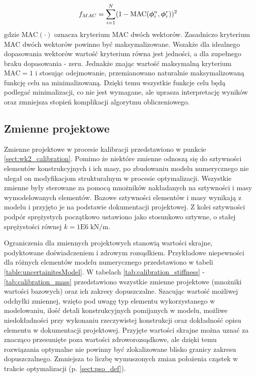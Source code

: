 \begin{equation} \label{eq:wk2_calib_f_mass}
	f_{MAC}=\sum_{i=1}^{N} (1-\text{MAC}(\bm{\phi}_i^n, \bm{\phi}_i^r))^2
\end{equation}
gdzie $\text{MAC}(\cdot)$ oznacza kryterium MAC dwóch wektorów. Zasadniczo kryterium MAC dwóch wektorów powinno być maksymalizowane. Wszakże dla idealnego dopasowania wektorów wartość kryterium równa jest jedności, a dla zupełnego braku dopasowania - zeru. Jednakże znając wartość maksymalną kryterium $\text{MAC}=1$ i stosując odejmowanie, przemianowano naturalnie maksymalizowaną funkcję celu na minimalizowaną. Dzięki temu wszystkie funkcje celu będą podlegać minimalizacji, co nie jest wymagane, ale uprasza interpretację wyników oraz zmniejsza stopień komplikacji algorytmu obliczeniowego.

\subsection{Zmienne projektowe}
Zmienne projektowe w procesie kalibracji przedstawiono w punkcie \ref{sect:wk2_calibration}. Pomimo że niektóre zmienne odnoszą się do sztywności elementów konstrukcyjnych i ich masy, po zbudowaniu modelu numerycznego nie ulegał on modyfikacjom strukturalnym w procesie optymalizacji. Wszystkie zmienne były sterowane za pomocą mnożników nakładanych na sztywności i masy wymodelowanych elementów. Bazowe sztywności elementów i masy wynikają z modelu i przyjęto je na podstawie dokumentacji projektowej. Z kolei sztywności podpór sprężystych początkowo ustawiono jako stosunkowo sztywne, o stałej sprężystości równej $k=1\text{E}6\;\text{kN/m}$. 

Ograniczenia dla zmiennych projektowych stanowią wartości skrajne, podyktowane doświadczeniem i zdrowym rozsądkiem. Przykładowe niepewności dla różnych elementów modelu numerycznego przedstawiono w tabeli \ref{table:uncertainitesModel}. W tabelach \ref{tab:calibration_stiffness} - \ref{tab:calibration_mass} przedstawiono wszystkie zmienne projektowe (mnożniki wartości bazowych) oraz ich zakresy dopuszczalne. Szacując wartość możliwej odchyłki zmiennej, wzięto pod uwagę typ elementu wykorzystanego w modelowaniu, ilość detali konstrukcyjnych pomijanych w modelu, możliwe niedokładności przy wykonaniu rzeczywistej konstrukcji oraz dokładność opisu elementu w dokumentacji projektowej. Przyjęte wartości skrajne można uznać za znacząco przesunięte poza wartości zdroworozsądkowe, ale dzięki temu rozwiązania optymalne nie powinny być zlokalizowane blisko granicy zakresu dopuszczalnego. Zmniejsza to liczbę wymuszonych zmian położenia cząstek w trakcie optymalizacji (p. \ref{sect:pso_def}).

